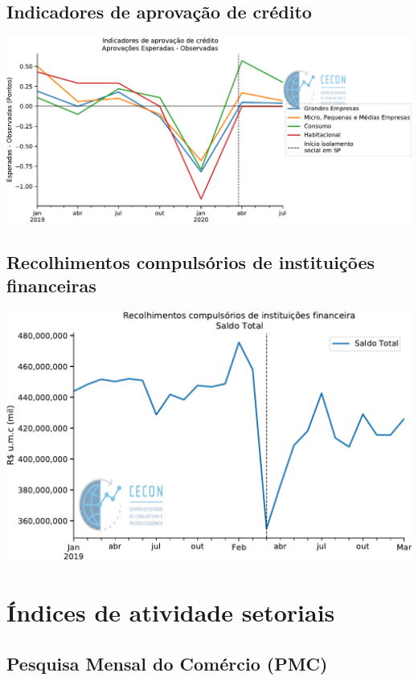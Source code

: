 \documentclass{SelfArx}
\begin{document}
\subsection*{Indicadores de aprovação de crédito}
\label{sec:orga3e2a8f}

\begin{center}
\includegraphics[width=.9\linewidth]{./figs/Credito/PTC.pdf}
\end{center}

\subsection*{Recolhimentos compulsórios de instituições financeiras}
\label{sec:org5eb86e0}

\begin{center}
\includegraphics[width=.9\linewidth]{./figs/Credito/Recolhimentos_Total.pdf}
\end{center}

\section*{Índices de atividade setoriais}
\label{sec:orgdfe92d5}


\subsection*{Pesquisa Mensal do Comércio (PMC)}
\label{sec:org648bbc1}
\end{document}
